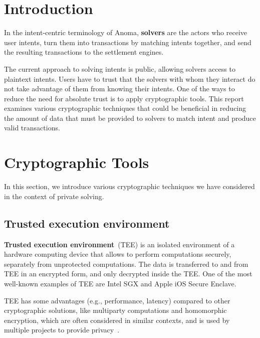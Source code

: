 \documentclass[
    9pt,            %
    report,        %
    affiltop,       %
]{art}
\begin{document}
\maketitle

\section{Introduction}\label{intro}

In the intent-centric terminology of Anoma, \textbf{solvers} are the actors who receive user intents, turn them into transactions by matching intents together, and send the resulting transactions to the settlement engines. 

The current approach to solving intents is public, allowing solvers access to plaintext intents. Users have to trust that the solvers with whom they interact do not take advantage of them from knowing their intents. One of the ways to reduce the need for absolute trust is to apply cryptographic tools. This report examines various cryptographic techniques that could be beneficial in reducing the amount of data that must be provided to solvers to match intent and produce valid transactions.

\section{Cryptographic Tools}\label{tools}

In this section, we introduce various cryptographic techniques we have considered in the context of private solving. 

\subsection{Trusted execution environment}\label{TEE}

\textbf{Trusted execution environment}~(TEE) is an isolated environment of a
hardware computing device that allows to perform computations securely,
separately from unprotected computations. The data is transferred to and from
TEE in an encrypted form, and only decrypted inside the TEE. One of the most
well-known examples of TEE are Intel SGX and Apple iOS Secure Enclave. 

TEE has some advantages (e.g., performance, latency) compared to other cryptographic solutions, like multiparty computations and homomorphic encryption, which are often considered in similar contexts, and is used by multiple projects to provide privacy~\citep{flash,secret}.
\end{document}
